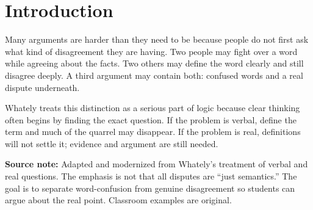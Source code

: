 \documentclass[12pt]{article}
\newcommand{\focusbox}[1]{\par\vspace{0.4em}\noindent\begingroup\setlength{\fboxsep}{6pt}\colorbox{gray!12}{\begin{minipage}{\dimexpr\linewidth-2\fboxsep\relax}#1\end{minipage}}\endgroup\par\vspace{0.5em}}
\begin{document}
\section*{Introduction}
Many arguments are harder than they need to be because people do not first ask what kind of disagreement they are having. Two people may fight over a word while agreeing about the facts. Two others may define the word clearly and still disagree deeply. A third argument may contain both: confused words and a real dispute underneath.

Whately treats this distinction as a serious part of logic because clear thinking often begins by finding the exact question. If the problem is verbal, define the term and much of the quarrel may disappear. If the problem is real, definitions will not settle it; evidence and argument are still needed.

\focusbox{\textbf{Source note:} Adapted and modernized from Whately's treatment of verbal and real questions. The emphasis is not that all disputes are ``just semantics.'' The goal is to separate word-confusion from genuine disagreement so students can argue about the real point. Classroom examples are original.}
\end{document}
